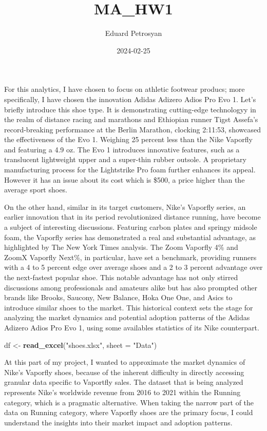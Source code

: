 \documentclass[
]{article}
\title{MA\_HW1}
\author{Eduard Petrosyan}
\date{2024-02-25}
\newenvironment{Shaded}{\begin{snugshade}}{\end{snugshade}}
\newcommand{\AttributeTok}[1]{\textcolor[rgb]{0.13,0.29,0.53}{#1}}
\newcommand{\FunctionTok}[1]{\textcolor[rgb]{0.13,0.29,0.53}{\textbf{#1}}}
\newcommand{\NormalTok}[1]{#1}
\newcommand{\OtherTok}[1]{\textcolor[rgb]{0.56,0.35,0.01}{#1}}
\newcommand{\StringTok}[1]{\textcolor[rgb]{0.31,0.60,0.02}{#1}}
\begin{document}
\maketitle

For this analytics, I have chosen to focus on athletic footwear producs;
more specifically, I have chosen the innovation Adidas Adizero Adios Pro
Evo 1. Let's briefly introduce this shoe type. It is demonstrating
cutting-edge technologyy in the realm of distance racing and marathons
and Ethiopian runner Tigst Assefa's record-breaking performance at the
Berlin Marathon, clocking 2:11:53, showcased the effectiveness of the
Evo 1. ⁤⁤Weighing 25 percent less than the Nike Vaporfly and featuring a
4.9 oz. The Evo 1 introduces innovative features, such as a translucent
lightweight upper and a super-thin rubber outsole. ⁤⁤A proprietary
manufacturing process for the Lightstrike Pro foam further enhances its
appeal. ⁤⁤However it has an issue about its cost which is \$500, a price
higher than the average sport shoes.

On the other hand, similar in its target customers, Nike's Vaporfly
series, an earlier innovation that in its period revolutionized distance
running, have become a subject of interesting discussions. Featuring
carbon plates and springy midsole foam, the Vaporfly series has
demonstrated a real and substantial advantage, as highlighted by The New
York Times analysis. The Zoom Vaporfly 4\% and ZoomX Vaporfly Next\%, in
particular, have set a benchmark, providing runners with a 4 to 5
percent edge over average shoes and a 2 to 3 percent advantage over the
next-fastest popular shoe. This notable advantage has not only stirred
discussions among professionals and amateurs alike but has also prompted
other brands like Brooks, Saucony, New Balance, Hoka One One, and Asics
to introduce similar shoes to the market. This historical context sets
the stage for analyzing the market dynamics and potential adoption
patterns of the Adidas Adizero Adios Pro Evo 1, using some availables
statistics of its Nike counterpart.

\begin{Shaded}
\begin{Highlighting}[]
\NormalTok{df }\OtherTok{\textless{}{-}} \FunctionTok{read\_excel}\NormalTok{(}\StringTok{"shoes.xlsx"}\NormalTok{, }\AttributeTok{sheet =} \StringTok{"Data"}\NormalTok{)}
\end{Highlighting}
\end{Shaded}

At this part of my project, I wanted to approximate the market dynamics
of Nike's Vaporfly shoes, because of the inherent difficulty in directly
accessing granular data specific to Vaportfly sales. The dataset that is
being analyzed represents Nike's worldwide revenue from 2016 to 2021
within the Running category, which is a pragmatic alternative. When
taking the narrow part of the data on Running category, where Vaporfly
shoes are the primary focus, I could understand the insights into their
market impact and adoption patterns.
\end{document}
